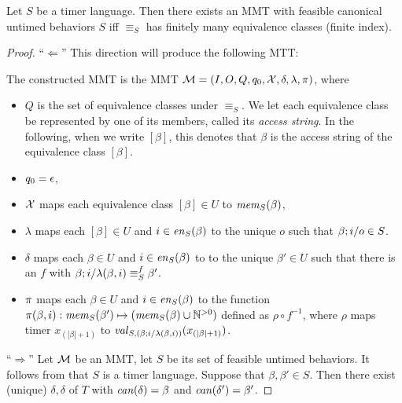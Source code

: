 \begin{theorem}
  \label{thm:bj-nerode}
Let $S$ be a timer language.
Then there exists an MMT with feasible canonical untimed behaviors $S$ iff 
$\equiv_S$ has finitely many equivalence classes (finite index).
\end{theorem}
\begin{proof} 
``$\Leftarrow$'' This direction will produce the following MTT:
\begin{definition}
\label{def:mmt-construction}
The constructed MMT is the MMT
${\mathcal M} = (I, O, Q, q_0, \mathcal{X}, \delta, \lambda, \pi)$, where
\begin{itemize}
\item $Q$ is the set of equivalence classes under $\equiv_S$. We let each
  equivalence class be represented by one of its members, called its
  {\em access string}. In the following, when we write $[\beta]$,
  this denotes that $\beta$ is the access string of the equivalence class $[\beta]$.
\item $q_0 = \epsilon$,
\item $\mathcal{X}$ maps each equivalence  class $[\beta]\in U$ to
  $\mathit{mem}_{S}(\beta)$,
\item $\lambda$ maps each $[\beta] \in U$ and $i \in \mathit{en}_{S}(\beta)$ to
  the unique $o$ such that $\beta;i/o \in S$. 
\item $\delta$ maps each $\beta \in U$ and
  $i \in \mathit{en}_{S}(\beta)$ to
  to the unique $\beta' \in U$ such that there is an $f$ with
  $\beta;i/\lambda(\beta,i) \equiv_{S}^f \beta'$.
\item $\pi$
 maps each $\beta \in U$ and $i \in \mathit{en}_{S}(\beta)$ to
  the function
  $\pi(\beta,i):\mathit{mem}_{S}(\beta') \mapsto (\mathit{mem}_{S}(\beta) \cup {\mathbb N}^{>0})$ defined as $\rho \circ f^{-1}$, where $\rho$ maps 
  timer $x_{(|\beta|+1)}$ to
$\mathit{val}_{S,(\beta;i/\lambda(\beta,i))}(x_{(|\beta|+1)})$.
\end{itemize}
\end{definition}
``$\Rightarrow$'' Let ${\mathcal M}$ be an MMT, let $S$ be its set of feasible untimed
  behaviors. It follows from  that $S$ is a timer language.
Suppose that $\beta, \beta' \in S$.
Then there exist (unique) $\delta, \delta$ of $T$ with
$\mathit{can}({\delta})=\beta$ and $\mathit{can}({\delta'})=\beta'$.

\end{proof}
